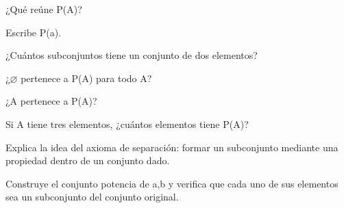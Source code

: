 \begin{activity}[id=dia-23-corta-01,type=short,weight=1]

¿Qué reúne P(A)?

\end{activity}

\begin{activity}[id=dia-23-corta-02,type=short,weight=1]

Escribe P({a}).

\end{activity}

\begin{activity}[id=dia-23-corta-03,type=short,weight=1]

¿Cuántos subconjuntos tiene un conjunto de dos elementos?

\end{activity}

\begin{activity}[id=dia-23-corta-04,type=short,weight=1]

¿\(\varnothing\) pertenece a P(A) para todo A?

\end{activity}

\begin{activity}[id=dia-23-corta-05,type=short,weight=1]

¿A pertenece a P(A)?

\end{activity}

\begin{activity}[id=dia-23-corta-06,type=short,weight=1]

Si A tiene tres elementos, ¿cuántos elementos tiene P(A)?

\end{activity}

\begin{activity}[id=dia-23-desarrollo-01,type=long,weight=2]

Explica la idea del axioma de separación: formar un subconjunto mediante una propiedad dentro de un conjunto dado.

\end{activity}

\begin{activity}[id=dia-23-desarrollo-02,type=long,weight=2]

Construye el conjunto potencia de {a,b} y verifica que cada uno de sus elementos sea un subconjunto del conjunto original.

\end{activity}

